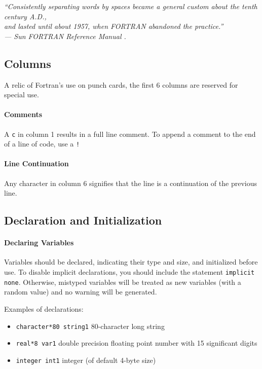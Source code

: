 \documentclass[10pt,letterpaper,oneside]{report}
\begin{document}
\begin{center}
\emph{“Consistently separating words by spaces became a general custom about the tenth century A.D., \\ and lasted until about 1957, when FORTRAN abandoned the practice.” \\
— Sun FORTRAN Reference Manual .}
\end{center}

\subsection{Columns}
A relic of Fortran's use on punch cards, the first 6 columns are reserved for special use.  

\paragraph{Comments}
A \texttt{c} in column 1 results in a full line comment.  To append a comment to the end of a line of code, use a \texttt{!}

\paragraph{Line Continuation}
Any character in column 6 signifies that the line is a continuation of the previous line. 

\subsection{Declaration and Initialization}
\paragraph{Declaring Variables}
Variables should be declared, indicating their type and size, and initialized before use.  To disable implicit declarations, you should include the statement \texttt{implicit none}.  Otherwise, mistyped variables will be treated as new variables (with a random value) and no warning will be generated.  

Examples of declarations: 
\begin{itemize}
\item \texttt{character*80 string1} 80-character long string
\item \texttt{real*8 var1} double precision floating point number with 15 significant digits
\item \texttt{integer int1} integer (of default 4-byte size)
\end{itemize}
\end{document}
